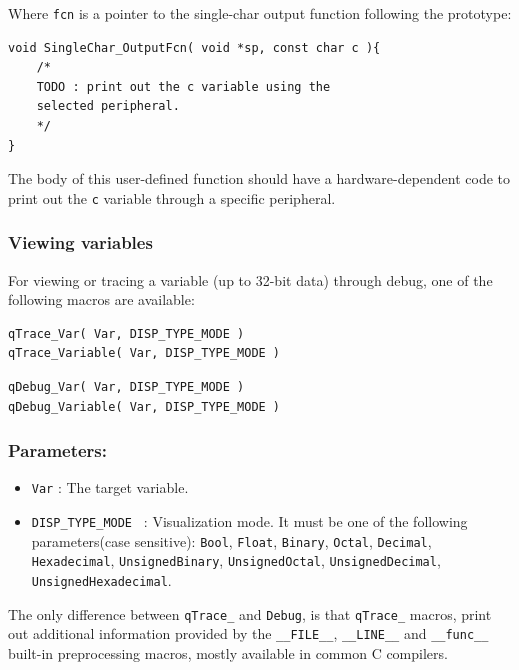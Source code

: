 \documentclass{article}
\begin{document}
Where \lstinline{fcn} is a pointer to the single-char output function following the prototype: \\

\begin{lstlisting}[style=CStyle]
void SingleChar_OutputFcn( void *sp, const char c ){
    /*
    TODO : print out the c variable using the
    selected peripheral.
    */
}
\end{lstlisting}

The body of this user-defined function should have a hardware-dependent code to print out the \lstinline{c} variable through a specific peripheral.

\subsubsection{Viewing variables}
For viewing or tracing a variable (up to 32-bit data) through debug, one of the following macros are available:    

\begin{lstlisting}[style=CStyle]
qTrace_Var( Var, DISP_TYPE_MODE )
qTrace_Variable( Var, DISP_TYPE_MODE )
\end{lstlisting}
\begin{lstlisting}[style=CStyle]
qDebug_Var( Var, DISP_TYPE_MODE )
qDebug_Variable( Var, DISP_TYPE_MODE )
\end{lstlisting}

\subsubsection*{Parameters:}
\begin{itemize}
    \item \lstinline{Var} : The target variable. 
    \item \lstinline{DISP_TYPE_MODE } :  Visualization mode. It must be one of the following parameters(case sensitive): \lstinline{Bool}, \lstinline{Float}, \lstinline{Binary}, \lstinline{Octal}, \lstinline{Decimal}, \lstinline{Hexadecimal}, \lstinline{UnsignedBinary}, \lstinline{UnsignedOctal}, \lstinline{UnsignedDecimal}, \lstinline{UnsignedHexadecimal}. 
\end{itemize}

The only difference between \lstinline{qTrace_} and  \lstinline{Debug}, is that \lstinline{qTrace_} macros, print out additional information provided by the \lstinline{__FILE__}, \lstinline{__LINE__} and \lstinline{__func__} built-in preprocessing macros, mostly available in common C compilers. 
\end{document}
